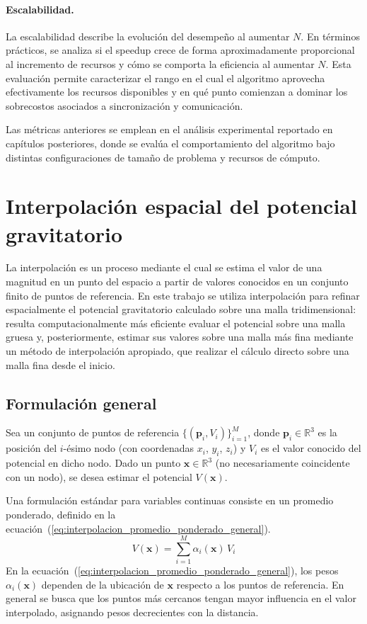\documentclass[a4paper,11pt]{book}
\begin{document}
\paragraph{Escalabilidad.} La escalabilidad describe la evolución del desempeño al aumentar $N$. En términos prácticos, se analiza si el speedup crece de forma aproximadamente proporcional al incremento de recursos y cómo se comporta la eficiencia al aumentar $N$. Esta evaluación permite caracterizar el rango en el cual el algoritmo aprovecha efectivamente los recursos disponibles y en qué punto comienzan a dominar los sobrecostos asociados a sincronización y comunicación.

Las métricas anteriores se emplean en el análisis experimental reportado en capítulos posteriores, donde se evalúa el comportamiento del algoritmo bajo distintas configuraciones de tamaño de problema y recursos de cómputo.

\section{Interpolación espacial del potencial gravitatorio}
\label{sec:interpolacion_potencial}

La interpolación es un proceso mediante el cual se estima el valor de una magnitud en un punto del espacio a partir de valores conocidos en un conjunto finito de puntos de referencia. En este trabajo se utiliza interpolación para refinar espacialmente el potencial gravitatorio calculado sobre una malla tridimensional: resulta computacionalmente más eficiente evaluar el potencial sobre una malla gruesa y, posteriormente, estimar sus valores sobre una malla más fina mediante un método de interpolación apropiado, que realizar el cálculo directo sobre una malla fina desde el inicio.

\subsection{Formulación general}

Sea un conjunto de puntos de referencia $\{(\mathbf{p}_i, V_i)\}_{i=1}^{M}$, donde $\mathbf{p}_i\in\mathbb{R}^3$ es la posición del $i$-ésimo nodo (con coordenadas $x_i$, $y_i$, $z_i$) y $V_i$ es el valor conocido del potencial en dicho nodo. Dado un punto $\mathbf{x}\in\mathbb{R}^3$ (no necesariamente coincidente con un nodo), se desea estimar el potencial $V(\mathbf{x})$.

Una formulación estándar para variables continuas consiste en un promedio ponderado, definido en la ecuación~(\ref{eq:interpolacion_promedio_ponderado_general}).
\begin{equation}
	V(\mathbf{x}) = \sum_{i=1}^{M} \alpha_i(\mathbf{x})\, V_i
	\label{eq:interpolacion_promedio_ponderado_general}
\end{equation}
En la ecuación~(\ref{eq:interpolacion_promedio_ponderado_general}), los pesos $\alpha_i(\mathbf{x})$ dependen de la ubicación de $\mathbf{x}$ respecto a los puntos de referencia. En general se busca que los puntos más cercanos tengan mayor influencia en el valor interpolado, asignando pesos decrecientes con la distancia.
\end{document}
